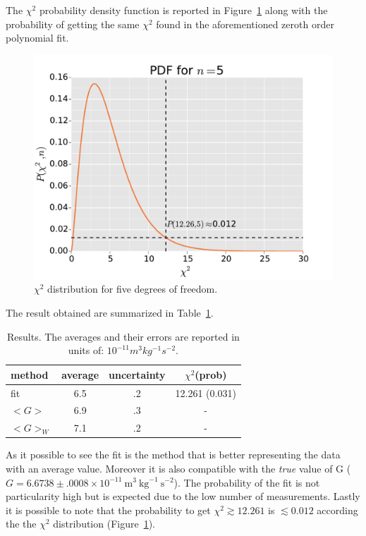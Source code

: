 \documentclass[twocolumn]{article}
\begin{document}
	The $\chi ^2 $ probability density function is reported in Figure~\ref{fig:xpdf} along with the probability of getting the same $\chi ^2 $ found in the aforementioned zeroth order polynomial fit.

	\begin{figure}[!]
		\begin{center}
			\includegraphics[width=.4 \textwidth]{fig/xpdf.pdf}
		\end{center}
		\caption{$\chi^2$ distribution for five degrees of freedom.}
		\label{fig:xpdf}
	\end{figure}
	The result obtained are summarized in Table~\ref{tab:res}.

	\begin{table}[htpb]
		\caption{Results. The averages and their errors are reported in units of: $10^{-11} m^3 kg^{-1} s^{-2}$.}
		\label{tab:res}
		\begin{center}
			\begin{tabular}{l|ccc}
			\hline

			\hline
			\textbf{method} & \textbf{average} & \textbf{uncertainty} & \textbf{$\chi ^2 $(prob)} \\
			\hline
			fit & 6.5 & .2 & 12.261 (0.031) \\
			$<G> $ & 6.9 & .3 & - \\
			$<G>_W$ &  7.1 & .2 & - \\
			\hline
			\hline
			\end{tabular}
		\end{center}
	\end{table}

	As it possible to see the fit is the method that is better representing the data with an average value.
	Moreover it is also compatible with the \emph{true} value of G ($ G = 6.6738 \pm .0008  \times 10^{-11} \ \mbox{m}^3 \ \mbox{kg}^{-1} \ \mbox{s}^{-2} $).
	The probability of the fit is not particularity high but is expected due to the low number of measurements.
	Lastly it is possible to note that the probability to get $\chi ^2 \gtrsim 12.261 $ is $ \lesssim 0.012$ according the the $\chi ^2$ distribution (Figure~\ref{fig:xpdf}).
\end{document}

